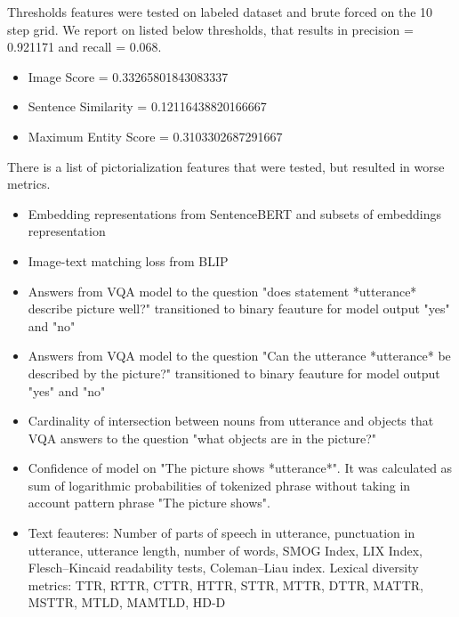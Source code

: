 \documentclass[11pt]{article}
\begin{document}
\smallskip

Thresholds features were tested on labeled dataset and brute forced on the 10 step grid. We report on listed below thresholds, that results in precision = 0.921171 and recall = 0.068.
    \begin{itemize}
        \item Image Score = 0.33265801843083337
        \item Sentence Similarity = 0.12116438820166667
        \item Maximum Entity Score = 0.3103302687291667
    \end{itemize}

\medskip

There is a list of pictorialization features that were tested, but resulted in worse metrics. 
\begin{itemize}
    \item Embedding representations from SentenceBERT and subsets of embeddings representation
    \item Image-text matching loss from BLIP
    \item Answers from VQA model to the question "does statement *utterance* describe picture well?" transitioned to binary feauture for model output "yes" and "no" 
    \item Answers from VQA model to the question "Can the utterance *utterance* be described by the picture?" transitioned to binary feauture for model output "yes" and "no" 
    \item Cardinality of intersection between nouns from utterance and objects that VQA answers to the question "what objects are in the picture?"
    \item Confidence of model on "The picture shows *utterance*". It was calculated as sum of logarithmic probabilities of tokenized phrase without taking in account pattern phrase "The picture shows".
    \item Text feauteres: Number of parts of speech in utterance, punctuation in utterance, utterance length, number of words, SMOG Index, LIX Index, Flesch–Kincaid readability tests, Coleman–Liau index. Lexical diversity metrics: TTR, RTTR, CTTR, HTTR, STTR, MTTR, DTTR, MATTR, MSTTR, MTLD, MAMTLD, HD-D \cite{ruTS}
\end{itemize}
\end{document}
